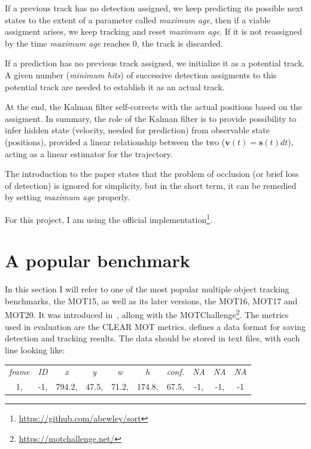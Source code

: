 If a previous track has no detection assigned, we keep predicting its possible next states to the extent of a parameter called \textit{maximum age}, then if a viable assigment arises, we keep tracking and reset \textit{maximum age}. If it is not reassigned by the time \textit{maximum age} reaches 0, the track is discarded.

If a prediction has no previous track assigned, we initialize it as a potential track. A given number (\textit{minimum hits}) of successive detection assigments to this potential track are needed to establish it as an actual track.

At the end, the Kalman filter self-corrects with the actual positions based on the assigment. In summary, the role of the Kalman filter is to provide possibility to infer hidden state (velocity, needed for prediction) from observable state (positions), provided a linear relationship between the two (\begin{math}\textbf{v}(t) = \textbf{s}(t)dt\end{math}), acting as a linear estimator for the trajectory.

The introduction to the paper states that the problem of occlusion (or brief loss of detection) is ignored for simplicity, but in the short term, it can be remedied by setting \textit{maximum age} properly.

For this project, I am using the official implementation\footnote{\url{https://github.com/abewley/sort}}.

\section{A popular benchmark}

In this section I will refer to one of the most popular multiple object tracking benchmarks, the MOT15, as well as its later versions, the MOT16, MOT17 and MOT20. It was introduced in~\cite{MOT15}, allong with the MOTChallenge\footnote{\url{https://motchallenge.net/}}. The metrics used in evaluation are the CLEAR MOT metrics. \cite{MOT15} defines a data format for saving detection and tracking results. The data should be stored in text files, with each line looking like:

\begin{table}[h]
    \centering
    \begin{tabular}{c c c c c c c c c c}
        \textit{frame} & \textit{ID} & \textit{x} & \textit{y} & \textit{w} & \textit{h} & \textit{conf.} & \textit{NA} & \textit{NA} & \textit{NA} \\
        1, & -1, & 794.2, & 47.5, & 71.2, & 174.8, & 67.5, & -1, & -1, & -1 \\
    \end{tabular}
\end{table}

